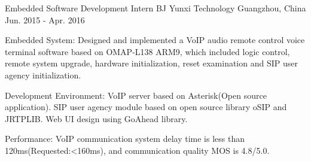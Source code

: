 \begin{cventries}
  \cventry
    {Embedded Software Development Intern} %
    {BJ Yunxi Technology} %
    {Guangzhou, China} %
    {Jun. 2015 - Apr. 2016} %
    {
      \begin{cvitems} %
        \item {Embedded System: Designed and implemented a VoIP audio remote control voice terminal software based on OMAP-L138 ARM9, which included logic control, remote system upgrade, hardware initialization, reset examination and SIP user agency initialization.}
        \item  {Development Environment: VoIP server based on Asterisk(Open source application). SIP user agency module based on open source library oSIP and JRTPLIB. Web UI design using GoAhead library.}
        \item  {Performance: VoIP communication system delay time is less than 120ms(Requested:<160ms), and communication quality MOS is 4.8/5.0.}
      \end{cvitems}
    }

\end{cventries}
